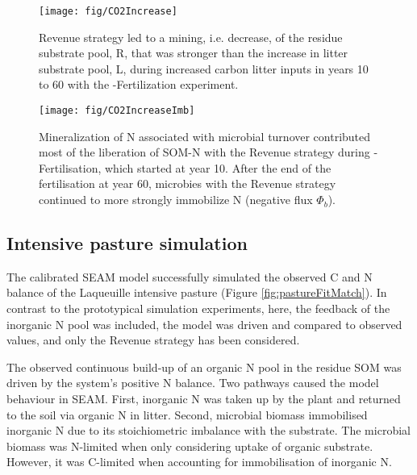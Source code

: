 \begin{figure}[t] \vspace*{2mm}
\begin{center}
\texttt{[image: fig/CO2Increase]}
\end{center}
\caption{
Revenue strategy led to a mining, i.e. decrease, of the residue substrate pool,
R, that was stronger than the increase in litter substrate pool, L, during
increased carbon litter inputs in years 10 to 60 with the
-Fertilization experiment.
\label{fig:CO2Increase}}

\end{figure}
\begin{figure}[t] \vspace*{2mm}
\begin{center}
\texttt{[image: fig/CO2IncreaseImb]} 
\end{center}
\caption{
Mineralization of N associated with microbial turnover 
contributed most of the liberation of SOM-N with the Revenue strategy during
-Fertilisation, which started at year 10. 
After the end of the fertilisation at year 60, microbies with the Revenue
strategy continued to more strongly immobilize N (negative flux $\Phi_b$).
\label{fig:CO2IncreaseImb}}
\end{figure}

\subsection{Intensive pasture simulation}
\label{sec:ResultsPasture}

The calibrated SEAM model successfully simulated the observed C and N balance of
the Laqueuille intensive pasture (Figure \ref{fig:pastureFitMatch}). In contrast
to the prototypical simulation experiments, here, the feedback of the inorganic
N pool was included, the model was driven and compared to observed values, and
only the Revenue strategy has been considered.

The observed continuous build-up of an organic N pool in the residue SOM was
driven by the system's positive N balance. Two pathways caused the model
behaviour in SEAM. First, inorganic N was taken up by the plant and returned to
the soil via organic N in litter. Second, microbial biomass immobilised
inorganic N due to its stoichiometric imbalance with the substrate. The
microbial biomass was N-limited when only considering uptake of
organic substrate. However, it was C-limited when accounting for immobilisation
of inorganic N.

